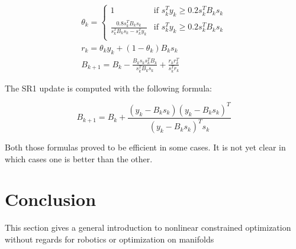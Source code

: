 \begin{equation}
\label{damped_BFGS}
\begin{split}
  \theta_k =
  \left\{
      \begin{array}{ll}
      1 & \text{if } s_k^T y_k \geq 0.2 s_k^T B_k s_k \\
      \frac{0.8 s_k^T B_k s_k}{s_k^T B_k s_k-s_k^T y_k} & \text{if } s_k^T y_k \geq 0.2s_k^T B_k s_k \\
      \end{array}
      \right.\\
      r_k = \theta_k y_k + (1-\theta_k) B_k s_k\\
      B_{k+1} = B_k-\frac{B_k s_k s_k^T B_k}{s_k^T B_k s_k} + \frac{r_k r_k^T}{s_k^T r_k}
\end{split}
\end{equation}

The SR1 update is computed with the following formula:

\begin{equation}
\label{SR1}
B_{k+1} = B_k + \frac{(y_k-B_k s_k){(y_k-B_k s_k)}^T}{{(y_k-B_k s_k)}^T s_k}
\end{equation}

Both those formulas proved to be efficient in some cases. It is not yet clear in which cases one is better than the other.

\section{Conclusion}
This section gives a general introduction to nonlinear constrained optimization without regards for robotics or optimization on manifolds

